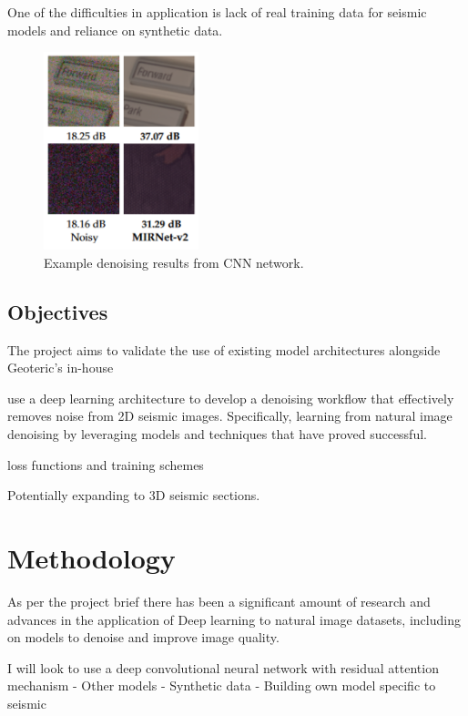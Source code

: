 \documentclass[project-plan]{report-template}
\begin{document}
One of the difficulties in application is lack of real training data for seismic models and reliance on synthetic data. 



\begin{figure}
    \begin{center}
        \includegraphics[width=0.4\textwidth]{latex/figures/noise_removal_ex.png}
    \end{center}
    \caption{\label{fig:experiment} Example denoising results from CNN network.}
\end{figure}

\subsection{Objectives}
The project aims to validate the use of existing model architectures alongside Geoteric's in-house 

use a deep learning architecture to develop a denoising workflow that effectively removes noise from 2D seismic images. 
Specifically, learning from natural image denoising by leveraging models and techniques that have proved successful. 


loss functions and training schemes

Potentially expanding to 3D seismic sections.


\section{Methodology}
As per the project brief there has been a significant amount of research and advances in the application of Deep learning to natural image datasets, including on models to denoise and improve image quality.

I will look to use a deep convolutional neural network with residual attention mechanism
- Other models
- Synthetic data
- Building own model specific to seismic
\end{document}
